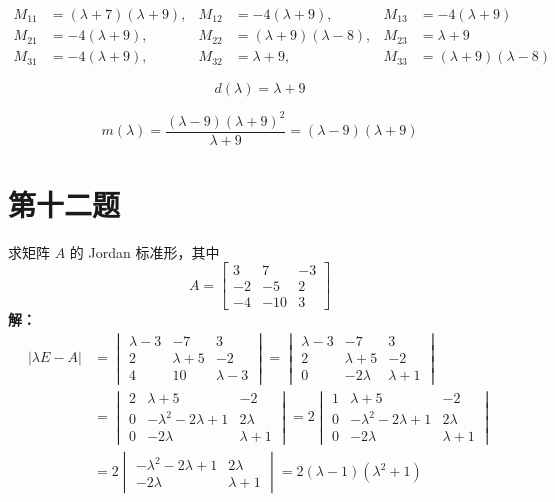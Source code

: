\documentclass{article}
\begin{document}
\[
\begin{aligned}
M_{11} &= (\lambda + 7)(\lambda + 9), & M_{12} &= -4(\lambda + 9), & M_{13} &= -4(\lambda + 9) \\
M_{21} &= -4(\lambda + 9), & M_{22} &= (\lambda + 9)(\lambda - 8), & M_{23} &= \lambda + 9 \\
M_{31} &= -4(\lambda + 9), & M_{32} &= \lambda + 9, & M_{33} &= (\lambda + 9)(\lambda - 8)
\end{aligned}
\]

\[
d(\lambda) = \lambda + 9
\]

\[
m(\lambda) = \frac{(\lambda - 9)(\lambda + 9)^2}{\lambda + 9} = (\lambda - 9)(\lambda + 9)
\]

\newpage
\section{第十二题}\noindent
求矩阵 $A$ 的 Jordan 标准形，其中
\[
A = \begin{bmatrix}
3 & 7 & -3 \\
-2 & -5 & 2 \\
-4 & -10 & 3
\end{bmatrix}
\]
\textbf{解：}
\[
\begin{aligned}
|\lambda E - A| &= 
\begin{vmatrix}
\lambda - 3 & -7 & 3 \\
2 & \lambda + 5 & -2 \\
4 & 10 & \lambda - 3
\end{vmatrix}
= 
\begin{vmatrix}
\lambda - 3 & -7 & 3 \\
2 & \lambda + 5 & -2 \\
0 & -2\lambda & \lambda + 1
\end{vmatrix} \\[6pt]
&= 
\begin{vmatrix}
2 & \lambda + 5 & -2 \\
0 & -\lambda^2 - 2\lambda + 1 & 2\lambda \\
0 & -2\lambda & \lambda + 1
\end{vmatrix}
= 2
\begin{vmatrix}
1 & \lambda + 5 & -2 \\
0 & -\lambda^2 - 2\lambda + 1 & 2\lambda \\
0 & -2\lambda & \lambda + 1
\end{vmatrix} \\[6pt]
&= 2
\begin{vmatrix}
-\lambda^2 - 2\lambda + 1 & 2\lambda \\
-2\lambda & \lambda + 1
\end{vmatrix}
= 2(\lambda - 1)(\lambda^2 + 1)
\end{aligned}
\]
\end{document}
